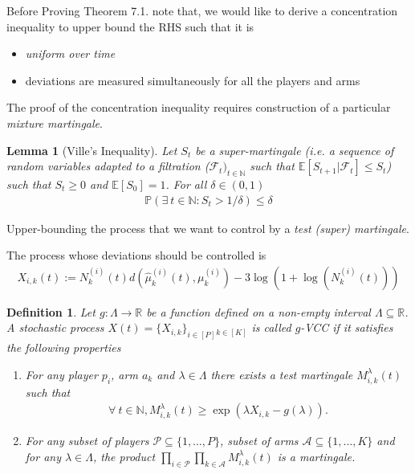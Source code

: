 \documentclass{article}
\newcommand{\E}{\mathbb{E}}
\newcommand{\R}{\mathbb{R}}
\newtheorem{definition}[theorem]{Definition}
\newtheorem{lemma}[theorem]{Lemma}
\begin{document}
Before Proving Theorem 7.1. note that, we would like to derive a concentration inequality to upper bound the RHS such that it is
\begin{itemize}
    \item \textit{uniform over time} 
    \item deviations are measured simultaneously for all the players and arms 
\end{itemize}

The proof of the concentration inequality requires construction of a particular \textit{mixture martingale}.


\begin{lemma}[Ville's Inequality] 
    Let $S_t$ be a super-martingale (i.e. a sequence of random variables adapted to a filtration ($\mathcal{F}_t)_{t\in\mathbb{N}}$ such that $\E[S_{t+1}|\mathcal{F}_t]\leq S_t$) such that $S_t\geq 0$ and $\E[S_0]=1$. For all $\delta\in(0,1)$ 
    \begin{align*}
        \mathbb{P}(\exists\ t\in \mathbb{N}: S_t>1/\delta)\leq \delta
    \end{align*}
\end{lemma}
Upper-bounding the process that we want to control by a \textit{test (super) martingale}.

The process whose deviations should be controlled is 
\begin{align*}
   X_{i,k}(t):= N^{(i)}_k(t) d(\hat{\mu}^{(i)}_k(t),\mu^{(i)}_k)-3\log\left(1+\log\left(N^{(i)}_k(t)\right)\right)
\end{align*}








\begin{definition}
  Let $g:\Lambda \to \R$ be a function defined on a non-empty interval $\Lambda\subseteq \R$. A stochastic process $X(t) = \{X_{i,k}\}_{i\in[P]}\phantom{}_{k\in[K]}$ is called $g$-VCC if it satisfies the following properties 
  \begin{enumerate}
      \item For any player $p_i$, arm $a_k$ and $\lambda\in\Lambda$
 there exists a test martingale $M^{\lambda}_{i,k}(t)$ such that 
 \begin{align*}
     \forall\ t\in\mathbb{N}, M^{\lambda}_{i,k}(t)\geq \exp\left(\lambda X_{i,k}-g(\lambda)\right).
 \end{align*}
 \item For any subset of players $\mathcal{P}\subseteq \{1,\ldots, P\}$, subset of arms $\mathcal{A}\subseteq \{1,\ldots, K\}$ and for any $\lambda\in\Lambda$, the product $\prod_{i\in \mathcal{P}}\prod_{k\in\mathcal{A}}M^{\lambda}_{i,k}(t)$ is a martingale. 
 \end{enumerate}
\end{definition}
\end{document}

